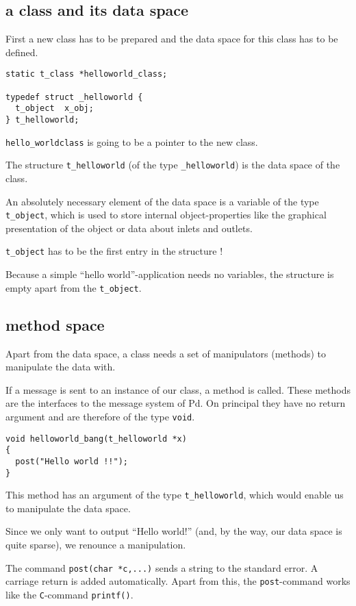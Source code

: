 \documentclass[12pt, a4paper,english,titlepage]{article}
\begin{document}
\subsection{a class and its data space}
First a new class has to be prepared and the data space for this class has to be defined.

\begin{verbatim}
static t_class *helloworld_class;

typedef struct _helloworld {
  t_object  x_obj;
} t_helloworld;
\end{verbatim}

\verb+hello_worldclass+ is going to be a pointer to the new class.

The structure \verb+t_helloworld+ (of the type \verb+_helloworld+) is
the data space of the class.

An absolutely necessary element of the data space is a variable of the type
\verb+t_object+, which is used to store internal object-properties like
the graphical presentation of the object or data about inlets and outlets.

\verb+t_object+ has to be the first entry in the structure !

Because a simple ``hello world''-application needs no variables,
the structure is empty apart from the \verb+t_object+.


\subsection{method space}
Apart from the data space, a class needs a set of manipulators (methods) to
manipulate the data with.

If a message is sent to an instance of our class, a method is called.
These methods are the interfaces to the message system of Pd.
On principal they have no return argument and are therefore of the
type \verb+void+.

\begin{verbatim}
void helloworld_bang(t_helloworld *x)
{
  post("Hello world !!");
}
\end{verbatim}


This method has an argument of the type \verb+t_helloworld+,
which would enable us to manipulate the data space.

Since we only want to output ``Hello world!''
(and, by the way, our data space is quite sparse),
we renounce a manipulation.

The command \verb+post(char *c,...)+ sends a string to the standard error.
A carriage return is added automatically.
Apart from this, the \verb+post+-command works like the {\tt C}-command \verb+printf()+.
\end{document}
